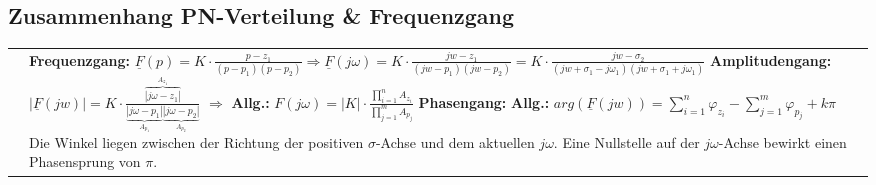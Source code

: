 \subsection{Zusammenhang PN-Verteilung \& Frequenzgang}
	\begin{tabular}{cp{14cm}}
		\parbox[c][5cm]{5.3cm}{}
		& \parbox{14cm}
		  {\textbf{Frequenzgang:}\\ 	
			$\underline{F}(p) = K \cdot \frac{p-z_1}{(p-p_1)(p-p_2)} \Rightarrow \underline{F}(j\omega) = K\cdot \frac{jw-z_1}{(jw-p_1)(jw-p_2)} = K\cdot \frac{jw-\sigma_2}{(jw+\sigma_1-j\omega_1)(jw+\sigma_1+j\omega_1)}$\\
		  \textbf{Amplitudengang:}\\
		    $|\underline{F}(jw)| = K\cdot \frac{\overbrace{|j\omega-z_1|}^{A_{z_1}}}{\underbrace{|j\omega-p_1|}_{A_{p_1}}\underbrace{|j\omega-p_2|}_{A_{p_2}}}$
		    $ \Rightarrow$ \textbf{Allg.:} $\boxed{F(j\omega) = |K|\cdot\frac{\prod\limits^{n}_{i=1} A_{z_i}}{\prod\limits^{m}_{j=1} A_{p_j}}}$\\
		  \textbf{Phasengang:}\\
		  	\textbf{Allg.:} $\boxed{arg(\underline{F}(jw)) = \sum\limits_{i=1}^{n} \varphi_{z_i} - \sum\limits_{j=1}^{m} \varphi_{p_j} + k \pi}$\\
		  	Die Winkel liegen zwischen der Richtung der positiven $\sigma$-Achse und dem aktuellen $j\omega$.\\
		  	Eine Nullstelle auf der $j\omega$-Achse bewirkt einen Phasensprung von $\pi$.
		    }
\end{tabular}


